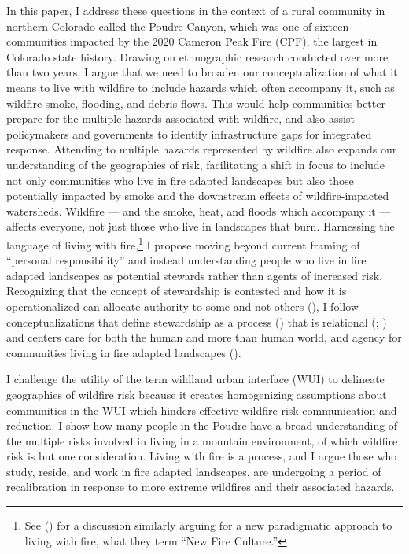 \documentclass[
]{article}
\begin{document}
In this paper, I address these questions in the context of a rural community in northern Colorado called the Poudre Canyon, which was one of sixteen communities impacted by the 2020 Cameron Peak Fire (CPF), the largest in Colorado state history. Drawing on ethnographic research conducted over more than two years, I argue that we need to broaden our conceptualization of what it means to live with wildfire to include hazards which often accompany it, such as wildfire smoke, flooding, and debris flows. This would help communities better prepare for the multiple hazards associated with wildfire, and also assist policymakers and governments to identify infrastructure gaps for integrated response. Attending to multiple hazards represented by wildfire also expands our understanding of the geographies of risk, facilitating a shift in focus to include not only communities who live in fire adapted landscapes but also those potentially impacted by smoke and the downstream effects of wildfire-impacted watersheds. Wildfire --- and the smoke, heat, and floods which accompany it --- affects everyone, not just those who live in landscapes that burn. Harnessing the language of living with fire,\footnote{See () for a discussion similarly arguing for a new paradigmatic approach to living with fire, what they term ``New Fire Culture.''} I propose moving beyond current framing of ``personal responsibility'' and instead understanding people who live in fire adapted landscapes as potential stewards rather than agents of increased risk. Recognizing that the concept of stewardship is contested and how it is operationalized can allocate authority to some and not others (), I follow conceptualizations that define stewardship as a process () that is relational (; ) and centers care for both the human and more than human world, and agency for communities living in fire adapted landscapes ().

I challenge the utility of the term wildland urban interface (WUI) to delineate geographies of wildfire risk because it creates homogenizing assumptions about communities in the WUI which hinders effective wildfire risk communication and reduction. I show how many people in the Poudre have a broad understanding of the multiple risks involved in living in a mountain environment, of which wildfire risk is but one consideration. Living with fire is a process, and I argue those who study, reside, and work in fire adapted landscapes, are undergoing a period of recalibration in response to more extreme wildfires and their associated hazards.
\end{document}
